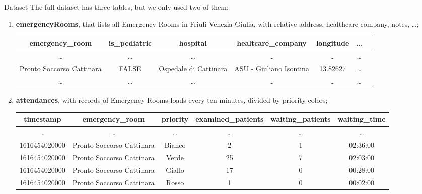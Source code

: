 \documentclass[8pt,english,aspectratio=169]{beamer}
\begin{document}
\begin{frame}{Dataset}
The full dataset has three tables, but we only used two of them:

\begin{enumerate}
	\item \textbf{emergencyRooms}, that lists all Emergency Rooms in Friuli-Venezia Giulia, with relative address, healthcare company, notes, \dots; 
		\begin{center}\small
			\begin{tabular}{ |c|c|c|c|c|c|c| }
				\hline
				\textbf{emergency\_room} & \textbf{is\_pediatric} & \textbf{hospital} & \textbf{healtcare\_company} & \textbf{longitude} & \dots \\
				\hline
				\dots & \dots & \dots & \dots & \dots & \dots \\
				\hline
				\footnotesize Pronto Soccorso Cattinara & \footnotesize FALSE & \footnotesize Ospedale di Cattinara & \footnotesize ASU - Giuliano Isontina & \footnotesize 13.82627 & \dots \\
				\hline
				\dots & \dots & \dots & \dots & \dots & \dots \\
				\hline
			\end{tabular}
		\end{center}
	\item \textbf{attendances}, with records of Emergency Rooms loads every ten minutes, divided by priority colors;
		\begin{center}\small
			\begin{tabular}{ |c|c|c|c|c|c| }
				\hline
				\textbf{timestamp} & \textbf{emergency\_room} & \textbf{priority} & \textbf{examined\_patients} & \textbf{waiting\_patients} & \textbf{waiting\_time} \\
				\hline
				\dots & \dots & \dots & \dots & \dots & \dots \\
				\hline
				\footnotesize 1616454020000 & \footnotesize Pronto Soccorso Cattinara & \footnotesize Bianco & \footnotesize 2 & \footnotesize 1 & \footnotesize 02:36:00 \\
				\hline
				\footnotesize 1616454020000 & \footnotesize Pronto Soccorso Cattinara & \footnotesize Verde & \footnotesize 25 & \footnotesize 7 & \footnotesize 02:03:00 \\
				\hline
				\footnotesize 1616454020000 & \footnotesize Pronto Soccorso Cattinara & \footnotesize Giallo & \footnotesize 17 & \footnotesize 0 & \footnotesize 00:28:00 \\
				\hline
				\footnotesize 1616454020000 & \footnotesize Pronto Soccorso Cattinara & \footnotesize Rosso & \footnotesize 1 & \footnotesize 0 & \footnotesize 00:02:00 \\

\end{tabular}
\end{center}
\end{enumerate}
\end{frame}
\end{document}
